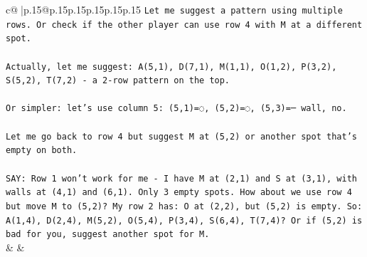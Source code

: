 \documentclass{article}
\begin{document}
{\begin{supertabular}{c@{$\;$}|p{.15\linewidth}@{}p{.15\linewidth}p{.15\linewidth}p{.15\linewidth}p{.15\linewidth}p{.15\linewidth}}
{{{\texttt{Let me suggest a pattern using multiple rows. Or check if the other player can use row 4 with M at a different spot.} \\
\\ 
\texttt{Actually, let me suggest: A(5,1), D(7,1), M(1,1), O(1,2), P(3,2), S(5,2), T(7,2) {-} a 2{-}row pattern on the top.} \\
\\ 
\texttt{Or simpler: let's use column 5: (5,1)=◌, (5,2)=◌, (5,3)=─ wall, no.} \\
\\ 
\texttt{Let me go back to row 4 but suggest M at (5,2) or another spot that's empty on both.} \\
\\ 
\texttt{SAY: Row 1 won't work for me {-} I have M at (2,1) and S at (3,1), with walls at (4,1) and (6,1). Only 3 empty spots. How about we use row 4 but move M to (5,2)? My row 2 has: O at (2,2), but (5,2) is empty. So: A(1,4), D(2,4), M(5,2), O(5,4), P(3,4), S(6,4), T(7,4)? Or if (5,2) is bad for you, suggest another spot for M.} \\
            }
        }
    }
    & & \\ \\


\end{supertabular}}
\end{document}
